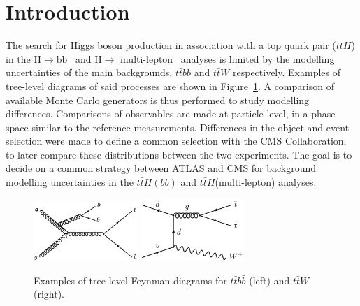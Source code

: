\section{Introduction}
\label{sec:intro}
The search for Higgs boson production in association with a top quark pair ($t\bar{t}H$) in the $\mathrm{H\rightarrow bb}$~\cite{HIGG-2017-03} and $\mathrm{H\rightarrow}$ multi-lepton~\cite{ATLAS-CONF-2019-045} analyses is limited by the modelling uncertainties of the main backgrounds, $t\bar{t}b\bar{b}$ and $t\bar{t}W$ respectively. %
Examples of tree-level diagrams of said processes are shown in Figure~\ref{intro:sig}. A comparison of available Monte Carlo generators is thus performed to study modelling differences. Comparisons of observables are made at particle level, in a phase space similar to the reference measurements. Differences in the object and event selection were made to define a common selection with the CMS Collaboration, to later compare these distributions between the two experiments. The goal is to decide on a common strategy between ATLAS and CMS for background modelling uncertainties in the $t\bar{t}H(bb)$ and $t\bar{t}H$(multi-lepton) analyses.

\begin{figure}[!htb]
\centering
\includegraphics[width=0.35\textwidth]{Plots/ttbb/ttbb}
\includegraphics[width=0.35\textwidth]{Plots/ttV/ttW}
  \caption{Examples of tree-level Feynman diagrams for $t\bar{t}b\bar{b}$ (left) and $t\bar{t}W$ (right). \label{intro:sig}}
\end{figure}
